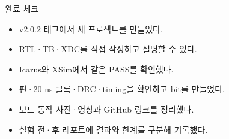 \begin{frame}{완료 체크}
\small
\begin{itemize}
\item[$\square$] v2.0.2 태그에서 새 프로젝트를 만들었다.
\item[$\square$] RTL·TB·XDC를 직접 작성하고 설명할 수 있다.
\item[$\square$] Icarus와 XSim에서 같은 PASS를 확인했다.
\item[$\square$] 핀·20 ns 클록·DRC·timing을 확인하고 bit를 만들었다.
\item[$\square$] 보드 동작 사진·영상과 GitHub 링크를 정리했다.
\item[$\square$] 실험 전·후 레포트에 결과와 한계를 구분해 기록했다.
\end{itemize}
\end{frame}

